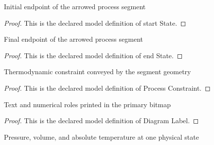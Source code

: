 \begin{definition}
  \label{def:physics:phyx-mini-0371:phyxminiproblems-problemphyxmini0371-diagramsegment-startstate}
  Initial endpoint of the arrowed process segment
\end{definition}
\begin{proof}
  This is the declared model definition of start State.
\end{proof}
\begin{definition}
  \label{def:physics:phyx-mini-0371:phyxminiproblems-problemphyxmini0371-diagramsegment-endstate}
  Final endpoint of the arrowed process segment
\end{definition}
\begin{proof}
  This is the declared model definition of end State.
\end{proof}
\begin{definition}
  \label{def:physics:phyx-mini-0371:phyxminiproblems-problemphyxmini0371-processconstraint}
  Thermodynamic constraint conveyed by the segment geometry
\end{definition}
\begin{proof}
  This is the declared model definition of Process Constraint.
\end{proof}
\begin{definition}
  \label{def:physics:phyx-mini-0371:phyxminiproblems-problemphyxmini0371-diagramlabel}
  Text and numerical roles printed in the primary bitmap
\end{definition}
\begin{proof}
  This is the declared model definition of Diagram Label.
\end{proof}
\begin{definition}
  \label{def:physics:phyx-mini-0371:phyxminiproblems-problemphyxmini0371-thermodynamicstate}
  Pressure, volume, and absolute temperature at one physical state
\end{definition}
